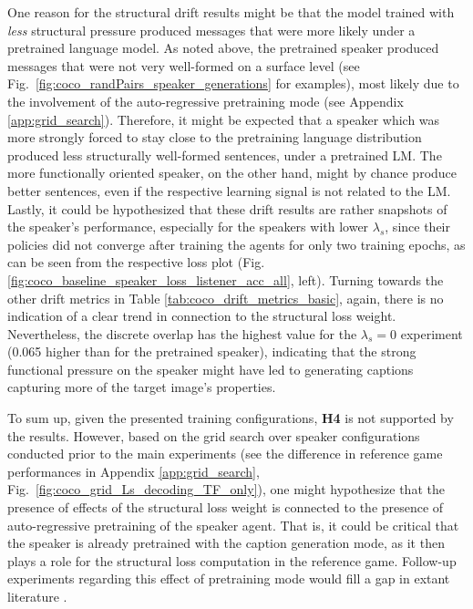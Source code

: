 One reason for the structural drift results might be that the model trained with \emph{less} structural pressure produced messages that were more likely under a pretrained language model. As noted above, the pretrained speaker produced messages that were not very well-formed on a surface level (see Fig.~\ref{fig:coco_randPairs_speaker_generations} for examples), most likely due to the involvement of the auto-regressive pretraining mode (see Appendix \ref{app:grid_search}). Therefore, it might be expected that a speaker which was more strongly forced to stay close to the pretraining language distribution produced less structurally well-formed sentences, under a pretrained LM. The more functionally oriented speaker, on the other hand, might by chance produce better sentences, even if the respective learning signal is not related to the LM. Lastly, it could be hypothesized that these drift results are rather snapshots of the speaker's performance, especially for the speakers with lower $\lambda_s$, since their policies did not converge after training the agents for only two training epochs, as can be seen from the respective loss plot (Fig. \ref{fig:coco_baseline_speaker_loss_listener_acc_all}, left). 
Turning towards the other drift metrics in Table \ref{tab:coco_drift_metrics_basic}, again, there is no indication of a clear trend in connection to the structural loss weight. Nevertheless, the discrete overlap has the highest value for the $\lambda_s = 0$ experiment (0.065 higher than for the pretrained speaker), indicating that the strong functional pressure on the speaker might have led to generating captions capturing more of the target image's properties.

To sum up, given the presented training configurations, \textbf{H4} is not supported by the results. However, based on the grid search over speaker configurations conducted prior to the main experiments (see the difference in reference game performances in Appendix \ref{app:grid_search}, Fig.~\ref{fig:coco_grid_Ls_decoding_TF_only}), one might hypothesize that the presence of effects of the structural loss weight is connected to the presence of auto-regressive pretraining of the speaker agent. That is, it could be critical that the speaker is already pretrained with the caption generation mode, as it then plays a role for the structural loss computation in the reference game. Follow-up experiments regarding this effect of pretraining mode would fill a gap in extant literature \parencite[but see][for related work]{lowe2020interaction}.

